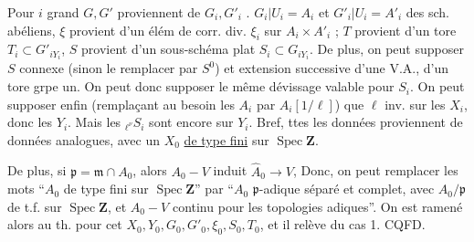 Pour $i$ grand $G,G'$ proviennent de $G_i,G'_i$ .
$G_i|U_i=A_i$ et $G'_i|U_i=A'_i$ des sch. abéliens, $\xi$ provient d'un élém de corr. div. $\xi_i$ sur $A_i\times A'_i$ ; $T$ provient d'un tore $T_i\subset G'_{iY_i}$, $S$ provient d'un sous-schéma plat $S_i\subset G_{iY_i}$.
De plus,   on peut  supposer $S$ connexe  (sinon le remplacer par $S^0$) et  extension  successive d'une V.A., d'un tore  grpe un. On peut donc supposer le même dévissage valable pour $S_i$.
On peut supposer enfin (remplaçant au besoin les $A_i$ par $A_i[1/\ell]$) que $\ell$ inv. sur les $X_i$, donc les $Y_i$. Mais les ${}_{\ell^\nu}S_i$ sont encore  sur $Y_i$. Bref, ttes les données proviennent de données analogues, avec un  $X_0$  \uline{de type fini} sur $\operatorname{Spec}\mathbf Z$.

De plus, si $\mathfrak p=\mathfrak m\cap A_0$, alors $A_0\mathbin{-}V$ induit $\widehat A_0\longrightarrow V$,  Donc, on peut remplacer les mots ``$A_0$ de type fini sur $\operatorname{Spec}\mathbf Z$'' par ``$A_0$ $\mathfrak p$-adique séparé et complet, avec $A_0/\mathfrak p$ de t.f. sur $\operatorname{Spec}\mathbf Z$, et $A_0\mathbin{-}V$ continu pour les topologies adiques''. On est ramené alors au th. pour cet $X_0,Y_0,G_0,G'_0,\xi_0,S_0,T_0$, et il relève du cas 1.
\hfill CQFD.
